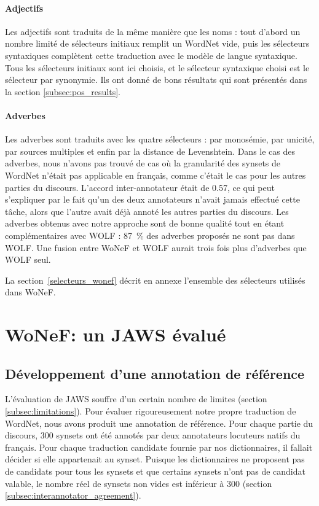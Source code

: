 \paragraph{Adjectifs} Les adjectifs sont traduits de la même manière que les
noms : tout d'abord un nombre limité de sélecteurs initiaux remplit un WordNet
vide, puis les sélecteurs syntaxiques complètent cette traduction avec le
modèle de langue syntaxique. Tous les sélecteurs initiaux sont ici choisis, et
le sélecteur syntaxique choisi est le sélecteur par synonymie. Ils ont donné de
bons résultats qui sont présentés dans la section \ref{subsec:pos_results}.

\paragraph{Adverbes} Les adverbes sont traduits avec les quatre sélecteurs :
par monosémie, par unicité, par sources multiples et enfin par la distance de
Levenshtein. Dans le cas des adverbes, nous n'avons pas trouvé de cas où la
granularité des synsets de WordNet n'était pas applicable en français, comme
c'était le cas pour les autres parties du discours. L'accord inter-annotateur
était de 0.57, ce qui peut s'expliquer par le fait qu'un des deux annotateurs
n'avait jamais effectué cette tâche, alors que l'autre avait déjà annoté les
autres parties du discours. Les adverbes obtenus avec notre approche sont de
bonne qualité tout en étant complémentaires avec WOLF : 87~\% des adverbes
proposés ne sont pas dans WOLF. Une fusion entre WoNeF et WOLF aurait trois
fois plus d'adverbes que WOLF seul.

La section~\ref{selecteurs_wonef} décrit en annexe l'ensemble des sélecteurs
utilisés dans WoNeF.

\section{WoNeF: un JAWS évalué}
\label{sec:evaluating_jaws}

\subsection{Développement d'une annotation de référence}
\label{subsec:gold_standard}

L'évaluation de JAWS souffre d'un certain nombre de limites (section
\ref{subsec:limitations}). Pour évaluer rigoureusement notre propre traduction
de WordNet, nous avons produit une annotation de référence. Pour chaque partie
du discours, 300 synsets ont été annotés par deux annotateurs locuteurs natifs
du français. Pour chaque traduction candidate fournie par nos dictionnaires, il
fallait décider si elle appartenait au synset. Puisque les dictionnaires ne
proposent pas de candidats pour tous les synsets et que certains synsets n'ont
pas de candidat valable, le nombre réel de synsets non vides est inférieur à
300 (section \ref{subsec:interannotator_agreement}).

